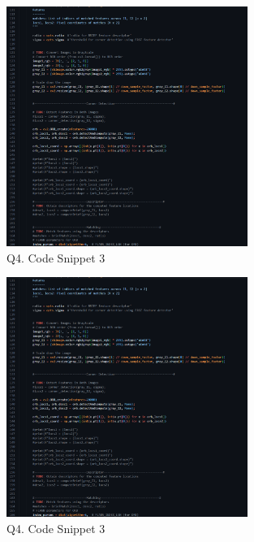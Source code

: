 \documentclass{article}
\begin{document}
	\begin{figure}[H]
		\centering
		\includegraphics[width=0.7\textwidth]{./Q4_pano_cns3.png}  %
		\caption{Q4. Code Snippet 3}
		\label{fig:Q4_cns3}
	\end{figure}	
	\begin{figure}[H]
		\centering
		\includegraphics[width=0.7\textwidth]{./Q4_pano_cns3.png}  %
		\caption{Q4. Code Snippet 3}
		\label{fig:Q4_cns3}
	\end{figure}
	
	\newpage
\end{document}
